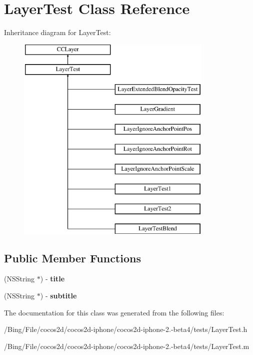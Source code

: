 \hypertarget{interface_layer_test}{\section{Layer\-Test Class Reference}
\label{interface_layer_test}
}
Inheritance diagram for Layer\-Test\-:\begin{figure}[H]
\begin{center}
\leavevmode
\includegraphics[height=10.000000cm]{interface_layer_test}
\end{center}
\end{figure}
\subsection*{Public Member Functions}
\begin{DoxyCompactItemize}
\item 
\hypertarget{interface_layer_test_a66d3fec3ce6f15d3259d7281bc7d65a5}{(N\-S\-String $\ast$) -\/ {\bfseries title}}\label{interface_layer_test_a66d3fec3ce6f15d3259d7281bc7d65a5}

\item 
\hypertarget{interface_layer_test_acb1ed6d2cdbe63710ef5d62718944fd6}{(N\-S\-String $\ast$) -\/ {\bfseries subtitle}}\label{interface_layer_test_acb1ed6d2cdbe63710ef5d62718944fd6}

\end{DoxyCompactItemize}


The documentation for this class was generated from the following files\-:\begin{DoxyCompactItemize}
\item 
/\-Bing/\-File/cocos2d/cocos2d-\/iphone/cocos2d-\/iphone-\/2.-\/beta4/tests/Layer\-Test.\-h\item 
/\-Bing/\-File/cocos2d/cocos2d-\/iphone/cocos2d-\/iphone-\/2.-\/beta4/tests/Layer\-Test.\-m\end{DoxyCompactItemize}
